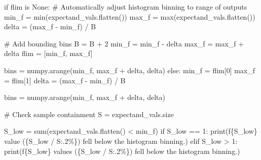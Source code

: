\documentclass[
  letterpaper,
  DIV=11,
  numbers=noendperiod]{scrartcl}
\newenvironment{Shaded}{\begin{snugshade}}{\end{snugshade}}
\newcommand{\BuiltInTok}[1]{\textcolor[rgb]{0.00,0.23,0.31}{#1}}
\newcommand{\CommentTok}[1]{\textcolor[rgb]{0.37,0.37,0.37}{#1}}
\newcommand{\ControlFlowTok}[1]{\textcolor[rgb]{0.00,0.23,0.31}{#1}}
\newcommand{\DecValTok}[1]{\textcolor[rgb]{0.68,0.00,0.00}{#1}}
\newcommand{\KeywordTok}[1]{\textcolor[rgb]{0.00,0.23,0.31}{#1}}
\newcommand{\NormalTok}[1]{\textcolor[rgb]{0.00,0.23,0.31}{#1}}
\newcommand{\OperatorTok}[1]{\textcolor[rgb]{0.37,0.37,0.37}{#1}}
\newcommand{\SpecialCharTok}[1]{\textcolor[rgb]{0.37,0.37,0.37}{#1}}
\newcommand{\SpecialStringTok}[1]{\textcolor[rgb]{0.13,0.47,0.30}{#1}}
\newcommand{\StringTok}[1]{\textcolor[rgb]{0.13,0.47,0.30}{#1}}
\newcommand{\VariableTok}[1]{\textcolor[rgb]{0.07,0.07,0.07}{#1}}
\begin{document}
\begin{Shaded}
\begin{Highlighting}[]
  \ControlFlowTok{if}\NormalTok{ flim }\KeywordTok{is} \VariableTok{None}\NormalTok{:}
    \CommentTok{\# Automatically adjust histogram binning to range of outputs}
\NormalTok{    min\_f }\OperatorTok{=} \BuiltInTok{min}\NormalTok{(expectand\_vals.flatten())}
\NormalTok{    max\_f }\OperatorTok{=} \BuiltInTok{max}\NormalTok{(expectand\_vals.flatten())}
\NormalTok{    delta }\OperatorTok{=}\NormalTok{ (max\_f }\OperatorTok{{-}}\NormalTok{ min\_f) }\OperatorTok{/}\NormalTok{ B}

    \CommentTok{\# Add bounding bins}
\NormalTok{    B }\OperatorTok{=}\NormalTok{ B }\OperatorTok{+} \DecValTok{2}
\NormalTok{    min\_f }\OperatorTok{=}\NormalTok{ min\_f }\OperatorTok{{-}}\NormalTok{ delta}
\NormalTok{    max\_f }\OperatorTok{=}\NormalTok{ max\_f }\OperatorTok{+}\NormalTok{ delta}
\NormalTok{    flim }\OperatorTok{=}\NormalTok{ [min\_f, max\_f]}

\NormalTok{    bins }\OperatorTok{=}\NormalTok{ numpy.arange(min\_f, max\_f }\OperatorTok{+}\NormalTok{ delta, delta)}
  \ControlFlowTok{else}\NormalTok{:}
\NormalTok{    min\_f }\OperatorTok{=}\NormalTok{ flim[}\DecValTok{0}\NormalTok{]}
\NormalTok{    max\_f }\OperatorTok{=}\NormalTok{ flim[}\DecValTok{1}\NormalTok{]}
\NormalTok{    delta }\OperatorTok{=}\NormalTok{ (max\_f }\OperatorTok{{-}}\NormalTok{ min\_f) }\OperatorTok{/}\NormalTok{ B}

\NormalTok{    bins }\OperatorTok{=}\NormalTok{ numpy.arange(min\_f, max\_f }\OperatorTok{+}\NormalTok{ delta, delta)}

  \CommentTok{\# Check sample containment}
\NormalTok{  S }\OperatorTok{=}\NormalTok{ expectand\_vals.size}

\NormalTok{  S\_low }\OperatorTok{=} \BuiltInTok{sum}\NormalTok{(expectand\_vals.flatten() }\OperatorTok{\textless{}}\NormalTok{ min\_f)}
  \ControlFlowTok{if}\NormalTok{ S\_low }\OperatorTok{==} \DecValTok{1}\NormalTok{:}
    \BuiltInTok{print}\NormalTok{(}\SpecialStringTok{f\textquotesingle{}}\SpecialCharTok{\{}\NormalTok{S\_low}\SpecialCharTok{\}}\SpecialStringTok{ value (}\SpecialCharTok{\{}\NormalTok{S\_low }\OperatorTok{/}\NormalTok{ S}\SpecialCharTok{:.2\%\}}\SpecialStringTok{)\textquotesingle{}}
           \StringTok{\textquotesingle{} fell below the histogram binning.\textquotesingle{}}\NormalTok{)}
  \ControlFlowTok{elif}\NormalTok{ S\_low }\OperatorTok{\textgreater{}} \DecValTok{1}\NormalTok{:}
    \BuiltInTok{print}\NormalTok{(}\SpecialStringTok{f\textquotesingle{}}\SpecialCharTok{\{}\NormalTok{S\_low}\SpecialCharTok{\}}\SpecialStringTok{ values (}\SpecialCharTok{\{}\NormalTok{S\_low }\OperatorTok{/}\NormalTok{ S}\SpecialCharTok{:.2\%\}}\SpecialStringTok{)\textquotesingle{}}
           \StringTok{\textquotesingle{} fell below the histogram binning.\textquotesingle{}}\NormalTok{)}


\end{Highlighting}
\end{Shaded}
\end{document}
